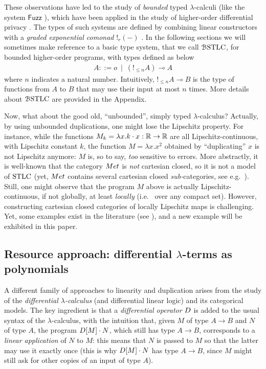 These observations have led to the study of \emph{bounded} typed $\lambda$-calculi (like the system $\mathsf{Fuzz}$ \cite{Reed_2010}), which have been applied in the study of higher-order differential privacy \cite{}. The types of such systems are defined \cite{} by combining linear constructors with a \emph{graded exponential comonad} $!_{r}(-)$ \cite{}.
In the following sections we will sometimes make reference to a basic type system, that we call $\mathcal{B}\mathrm{STLC}$, for bounded higher-order programs, with types defined as below
\begin{align}
A::= o \  \mid \  (!_{\leq n}A) \multimap A  
\end{align}
where $n$ indicates a natural number. Intuitively, $!_{\leq n}A\multimap B$ is the type of functions from $A$ to $B$ that may use their input at most $n$ times. More details about $\mathcal{B}\mathrm{STLC}$ are provided in the Appendix.


Now, what about the good old, ``unbounded'', simply typed $\lambda$-calculus? Actually, by using unbounded duplications, one might lose the Lipschitz property. For instance, while the functions $M_{k}=\lambda x. k\cdot x: \mathbb{R}\to \mathbb{R}$ are all Lipschitz-continuous, with Lipschitz constant $k$, the function $M=\lambda x.x^{2}$ obtained by ``duplicating'' $x$ is not Lipschitz anymore: $M$ is, so to say, \emph{too} sensitive to errors. 
More abstractly, it is well-known that the category $\Met$ is \emph{not} cartesian closed, so it is not a model of $\mathrm{STLC}$ (yet, $\Met$ contains several cartesian closed \emph{sub-}categories, see e.g.~\cite{}).
Still, one might observe that the program $M$ above is actually Lipschitz-continuous, if not globally, at least \emph{locally} (i.e.~ over any compact set). However, constructing cartesian closed categories of locally Lipschitz maps is challenging. Yet, some examples exist in the literature (see \cite{EhrhardPCOHdiff, PistoneLICS2021}), and a new example will be exhibited in this paper.


\subsection{Resource approach: differential $\lambda$-terms as polynomials}

A different family of approaches to linearity and duplication arises from the study of the \emph{differential $\lambda$-calculus} (and differential linear logic) and its categorical models. 
The key ingredient is that a \emph{differential operator} $\Der$ is added to the usual syntax of the $\lambda$-calculus, with the intuition that, given $M$ of type $A\to B$ and $N$ of type $A$, the program $\Der[M]\cdot N$, which still has type $A\to B$, corresponds to a \emph{linear application} of $N$ to $M$: this means that $N$ is passed to $M$ so that the latter may use it exactly once (this is why $\Der[M]\cdot N$ has type $A\to B$, since $M$ might still ask for other copies of an input of type $A$). 


